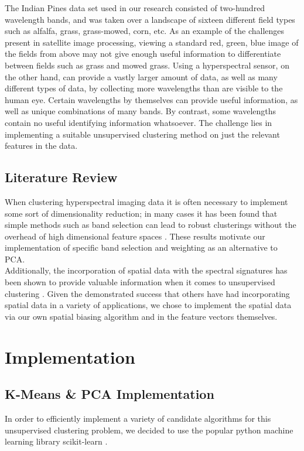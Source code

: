 \documentclass[journal]{IEEEtran}
\begin{document}
The Indian Pines \cite{IndianPines} data set used in our research consisted of two-hundred wavelength bands, and was taken over a landscape of sixteen different field types such as alfalfa, grass, grass-mowed, corn, etc. As an example of the challenges present in satellite image processing, viewing a standard red, green, blue image of the fields from above may not give enough useful information to differentiate between fields such as grass and mowed grass. Using a hyperspectral sensor, on the other hand, can provide a vastly larger amount of data, as well as many different types of data, by collecting more wavelengths than are visible to the human eye. Certain wavelengths by themselves can provide useful information, as well as unique combinations of many bands. By contrast, some wavelengths contain no useful identifying information whatsoever. The challenge lies in implementing a suitable unsupervised clustering method on just the relevant features in the data.\\



\subsection{Literature Review}
When clustering hyperspectral imaging data it is often necessary to implement some sort of dimensionality reduction; in many cases it has been found that simple methods such as band selection can lead to robust clusterings without the overhead of high dimensional feature spaces \cite{PCADimensionReduction}. These results motivate our implementation of specific band selection and weighting as an alternative to PCA.\\

Additionally, the incorporation of spatial data with the spectral signatures has been shown to provide valuable information when it comes to unsupervised clustering \cite{SpectralSpatial}. Given the demonstrated success that others have had incorporating spatial data in a variety of applications, we chose to implement the spatial data via our own spatial biasing algorithm and in the feature vectors themselves.\\

\section{Implementation}
  \subsection{K-Means \& PCA Implementation}
    In order to efficiently implement a variety of candidate algorithms for this unsupervised clustering problem, we decided to use the popular python machine learning library scikit-learn \cite{ScikitLearnAPI}.\\
\end{document}
